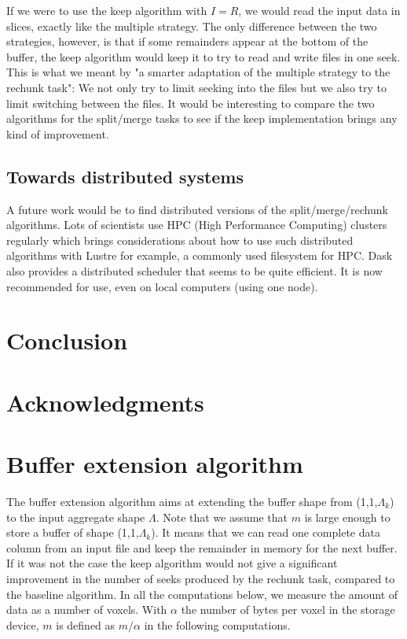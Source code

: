 \documentclass[conference]{IEEEtran}
\begin{document}
If we were to use the keep algorithm with $I=R$, we would read the input data
in slices, exactly like the multiple strategy. The only difference between the
two strategies, however, is that if some remainders appear at the bottom of the
buffer, the keep algorithm would keep it to try to read and write files in one
seek. This is what we meant by "a smarter adaptation of the multiple strategy
to the rechunk task": We not only try to limit seeking into the files but we
also try to limit switching between the files. It would be interesting to
compare the two algorithms for the split/merge tasks to see if the keep
implementation brings any kind of improvement.

\subsection{Towards distributed systems}
A future work would be to find distributed versions of the split/merge/rechunk
algorithms. Lots of scientists use HPC (High Performance Computing) clusters
regularly which brings considerations about how to use such distributed
algorithms with Lustre for example, a commonly used filesystem for HPC. Dask
also provides a distributed scheduler that seems to be quite efficient. It is
now recommended for use, even on local computers (using one node).

\section{Conclusion}

\section{Acknowledgments}




\appendices

\section{Buffer extension algorithm}
\label{bufferExtensionAlgorithm}
The buffer extension algorithm aims at extending the buffer shape from
(1,1,$\Lambda_k$) to the input aggregate shape $\Lambda$. Note that we assume
that $m$ is large enough to store a buffer of shape (1,1,$\Lambda_k$). It means
that we can read one complete data column from an input file and keep the
remainder in memory for the next buffer. If it was not the case the keep
algorithm would not give a significant improvement in the number of seeks
produced by the rechunk task, compared to the baseline algorithm. In all the
computations below, we measure the amount of data as a number of voxels. With
$\alpha$ the number of bytes per voxel in the storage device, $m$ is defined as
$m/\alpha$ in the following computations.
\end{document}

